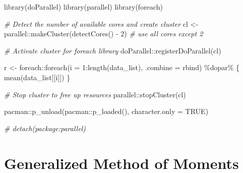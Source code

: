 \documentclass[
]{book}
\newenvironment{Shaded}{\begin{snugshade}}{\end{snugshade}}
\newcommand{\AttributeTok}[1]{\textcolor[rgb]{0.77,0.63,0.00}{#1}}
\newcommand{\CommentTok}[1]{\textcolor[rgb]{0.56,0.35,0.01}{\textit{#1}}}
\newcommand{\ConstantTok}[1]{\textcolor[rgb]{0.00,0.00,0.00}{#1}}
\newcommand{\DecValTok}[1]{\textcolor[rgb]{0.00,0.00,0.81}{#1}}
\newcommand{\FunctionTok}[1]{\textcolor[rgb]{0.00,0.00,0.00}{#1}}
\newcommand{\NormalTok}[1]{#1}
\newcommand{\OtherTok}[1]{\textcolor[rgb]{0.56,0.35,0.01}{#1}}
\newcommand{\SpecialCharTok}[1]{\textcolor[rgb]{0.00,0.00,0.00}{#1}}
\begin{document}
\begin{Shaded}
\begin{Highlighting}[]
\FunctionTok{library}\NormalTok{(doParallel)}
\FunctionTok{library}\NormalTok{(parallel)}
\FunctionTok{library}\NormalTok{(foreach)}

\CommentTok{\# Detect the number of available cores and create cluster}
\NormalTok{cl }\OtherTok{\textless{}{-}}\NormalTok{ parallel}\SpecialCharTok{::}\FunctionTok{makeCluster}\NormalTok{(}\FunctionTok{detectCores}\NormalTok{() }\SpecialCharTok{{-}} \DecValTok{2}\NormalTok{) }\CommentTok{\# use all cores except 2}

\CommentTok{\# Activate cluster for foreach library}
\NormalTok{doParallel}\SpecialCharTok{::}\FunctionTok{registerDoParallel}\NormalTok{(cl)}


\NormalTok{r }\OtherTok{\textless{}{-}}\NormalTok{ foreach}\SpecialCharTok{::}\FunctionTok{foreach}\NormalTok{(}\AttributeTok{i =} \DecValTok{1}\SpecialCharTok{:}\FunctionTok{length}\NormalTok{(data\_list),}
                      \AttributeTok{.combine =}\NormalTok{ rbind) }\SpecialCharTok{\%dopar\%}\NormalTok{ \{}
                          \FunctionTok{mean}\NormalTok{(data\_list[[i]])}
\NormalTok{                      \}}


\CommentTok{\# Stop cluster to free up resources}
\NormalTok{parallel}\SpecialCharTok{::}\FunctionTok{stopCluster}\NormalTok{(cl)}
\end{Highlighting}
\end{Shaded}

\begin{Shaded}
\begin{Highlighting}[]
\NormalTok{pacman}\SpecialCharTok{::}\FunctionTok{p\_unload}\NormalTok{(pacman}\SpecialCharTok{::}\FunctionTok{p\_loaded}\NormalTok{(), }\AttributeTok{character.only =} \ConstantTok{TRUE}\NormalTok{)}
\end{Highlighting}
\end{Shaded}

\begin{Shaded}
\begin{Highlighting}[]
\CommentTok{\# detach(package:parallel)}
\end{Highlighting}
\end{Shaded}

\hypertarget{generalized-method-of-moments}{%
\chapter{Generalized Method of Moments}\label{generalized-method-of-moments}}
\end{document}
